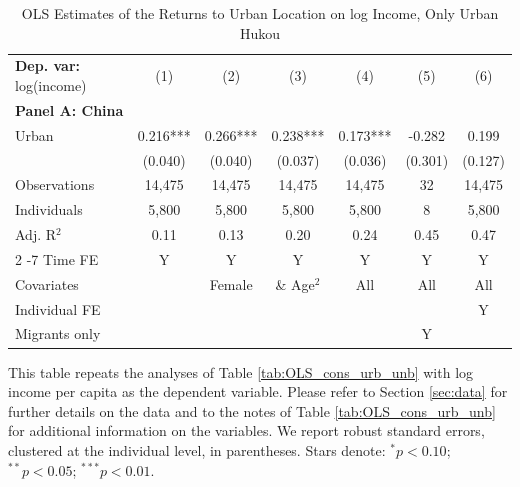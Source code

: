 \begin{table}[htbp] \centering \begin{threeparttable}
 \caption{OLS Estimates of the Returns to Urban Location on log Income, Only Urban Hukou} 
 \label{tab:OLS_CHN_hukou_urban_only_income_urban_unb} 
\begin{tabular}{l cccccc} \toprule  \textbf{Dep. var:}  log(income) 
                    &\multicolumn{1}{c}{(1)}   &\multicolumn{1}{c}{(2)}   &\multicolumn{1}{c}{(3)}   &\multicolumn{1}{c}{(4)}   &\multicolumn{1}{c}{(5)}   &\multicolumn{1}{c}{(6)}   \\
\textbf{Panel A: China} \\
Urban               &       0.216***&       0.266***&       0.238***&       0.173***&      -0.282   &       0.199   \\
                    &     (0.040)   &     (0.040)   &     (0.037)   &     (0.036)   &     (0.301)   &     (0.127)   \\
\addlinespace
Observations        &      14,475   &      14,475   &      14,475   &      14,475   &          32   &      14,475   \\
Individuals         &       5,800   &       5,800   &       5,800   &       5,800   &           8   &       5,800   \\
Adj. R$^{2}$        &        0.11   &        0.13   &        0.20   &        0.24   &        0.45   &        0.47   \\
\cmidrule{2 -7} Time FE & Y & Y & Y & Y & Y & Y \\ Covariates & & Female & \& Age$^2$ & All & All & All \\ Individual FE & & & & & & Y \\ Migrants only & & & & & Y & \\ \bottomrule \end{tabular} \begin{tablenotes}[flushleft] \footnotesize \item{This table repeats the analyses of Table \ref{tab:OLS_cons_urb_unb} with log income per capita as the dependent variable. Please refer to Section \ref{sec:data} for further details on the data and to the notes of Table \ref{tab:OLS_cons_urb_unb} for additional information on the variables. We report robust standard errors, clustered at the individual level, in parentheses. Stars denote: $^{*} p<0.10$; $^{**} p<0.05$; $^{***} p<0.01$.} \end{tablenotes} \end{threeparttable} \end{table}
